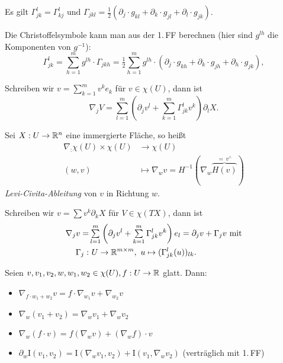 \documentclass{cheat-sheet}
\newcommand{\I}{\mathrm{I}}
\begin{document}
\begin{satz}
    Es gilt $\Gamma_{jk}^l = \Gamma_{kj}^l \,\, \text{und} \,\, \Gamma_{jkl} = \tfrac{1}{2} (\partial_j \cdot g_{kl} + \partial_k \cdot g_{jl} + \partial_l \cdot g_{jk})$.
\end{satz}

\begin{bem}
  Die Christoffelsymbole kann man aus der 1.\,FF berechnen (hier sind $g^{lh}$ die Komponenten von $g^{-1}$):
  \[
    \Gamma_{jk}^l = \sum_{h=1}^m g^{lh} \cdot \Gamma_{jkh} 
    = \tfrac{1}{2} \sum_{h=1}^m g^{lh} \cdot (\partial_j \cdot g_{kh} + \partial_k \cdot g_{jh} + \partial_h \cdot g_{jk}),
  \]
\end{bem}

\begin{bem}
  Schreiben wir $v = \sum_{k=1}^m v^k e_k$ für $v \in \chi(U)$, dann ist
  \[ \nabla_j V = \sum_{l=1}^m \left( \partial_j v^l + \sum_{k=1}^m \Gamma_{jk}^l v^k \right) \partial_l X. \]
\end{bem}



\begin{defn}
  Sei $X : U \to \mathbb{R}^n$ eine immergierte Fläche, so heißt
  \begin{align*}
    \nabla_ : \chi(U) \times \chi(U) &\to \chi(U) \\[-12pt]
    (w, v) &\mapsto \nabla_w v = H^{-1}(\nabla_w \overbrace{H(v)}^{=\,v^\wedge})
  \end{align*}
  \emph{Levi-Civita-Ableitung} von $v$ in Richtung $w$.
\end{defn}

\begin{bem}
  Schreiben wir $v = \sum v^k \partial_k X$ für $V \in \chi(TX)$, dann ist
  \begin{align*}
    \nabla_j v =& \sum_{l=1}^m \left( \partial_j v^l + \sum_{k=1}^m \Gamma_{jk}^l v^k \right) e_l = \partial_j v + \Gamma_j v \text{ mit}\\
    \Gamma_j :& \,\, U \to \R^{m \times m}, \,\, u \mapsto (\Gamma_{jk}^l(u))_{lk}.
  \end{align*}
\end{bem}

\begin{satz}
  Seien $v, v_1, v_2, w, w_1, w_2 \in \chi(U), f : U \to \mathbb{R}$ glatt. Dann:
  \begin{itemize}
    \item $\nabla_{f \cdot w_1 + w_2} v = f \cdot \nabla_{w_1} v + \nabla_{w_2} v$
    \item $\nabla_w (v_1 + v_2) = \nabla_w v_1 + \nabla_w v_2$
    \item $\nabla_w (f \cdot v) = f (\nabla_w v) + (\nabla_w f) \cdot v$
    \item $\partial_w \I(v_1, v_2) = \I(\nabla_w v_1, v_2) + \I(v_1, \nabla_w v_2)$ (verträglich mit 1.\,FF)
  \end{itemize}
\end{satz}
\end{document}
